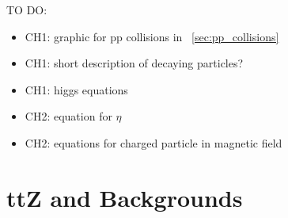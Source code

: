 \documentclass[12pt,chapterheads,oneside]{ucsd}
\begin{document}
\graphicspath{
{Figs/}
}



TO DO:\\
\begin{itemize}
\item CH1: graphic for pp collisions in ~\ref{sec:pp_collisions}
\item CH1: short description of decaying particles?
\item CH1: higgs equations
\item CH2: equation for $\eta$
\item CH2: equations for charged particle in magnetic field\\

\end{itemize}








\chapter{ttZ and Backgrounds}
	
	



	








   






\appendix
\end{document}
